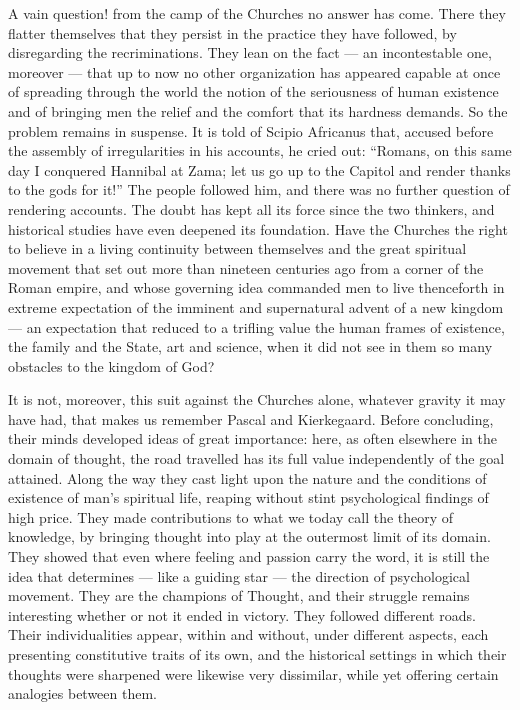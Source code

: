 \documentclass[12pt,a4paper]{article}
\newcommand{\opage}[1]{\marginnote{\footnotesize\textit{[#1]}}}
\begin{document}
A vain question! from the camp of the Churches no answer has come.
There they flatter themselves that they persist in the practice they have
followed, by disregarding the recriminations. They lean on the fact --- an
incontestable one, moreover --- that up to now no other organization has
appeared capable at once of spreading through the world the notion of the
seriousness of human existence
\opage{222}and of bringing men the relief and the comfort that its hardness demands. So
the problem remains in suspense. It is told of Scipio Africanus that, accused
before the assembly of irregularities in his accounts, he cried out: ``Romans,
on this same day I conquered Hannibal at Zama; let us go up to the Capitol and
render thanks to the gods for it!'' The people followed him, and there was no
further question of rendering accounts. The doubt has kept all its force since
the two thinkers, and historical studies have even deepened its foundation.
Have the Churches the right to believe in a living continuity between
themselves and the great spiritual movement that set out more than nineteen
centuries ago from a corner of the Roman empire, and whose governing idea
commanded men to live thenceforth in extreme expectation of the imminent and
supernatural advent of a new kingdom --- an expectation that reduced to a
trifling value the human frames of existence, the family and the State, art
and science, when it did not see in them so many obstacles to the kingdom of
God?

It is not, moreover, this suit against the Churches alone, whatever gravity it
may have had, that makes us remember Pascal and Kierkegaard. Before concluding,
their minds developed ideas of great importance: here, as often elsewhere in
the domain of thought, the road travelled has its full value independently of
the goal attained. Along the way they cast light upon the nature and the
conditions of existence of man's spiritual life, reaping without stint
psychological findings of high price. They made contributions to what we today
call the theory of knowledge, by bringing thought into play at the outermost
limit of its domain. They showed that even where feeling and passion carry the
word, it is still the idea that determines --- like a guiding star --- the
direction of psychological movement. They are the champions of Thought, and
their struggle remains interesting whether or not it ended in victory. They
followed different roads. Their individualities appear, within and without,
under different aspects, each presenting constitutive traits of its own, and
the historical settings in which their thoughts were sharpened were likewise
very dissimilar, while yet offering certain analogies between them.
\end{document}
